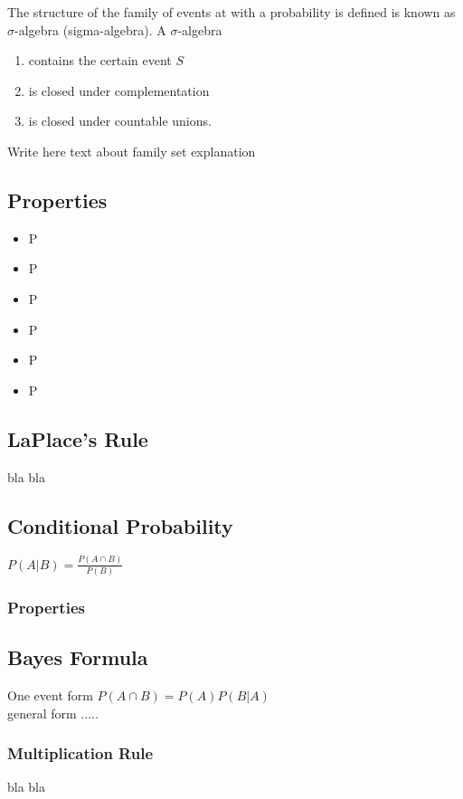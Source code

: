 The structure of the family of events at with a probability is defined is known as $\sigma$-algebra (sigma-algebra).
A $\sigma$-algebra 
\begin{enumerate}
    \item contains the certain event $S$
    \item is closed under complementation
    \item is closed under countable unions.
\end{enumerate}

Write here text about family set explanation

\subsection{Properties}
\begin{itemize}
    \item P
    \item P
    \item P
    \item P
    \item P
    \item P
\end{itemize}

\subsection{LaPlace's Rule}
bla bla

\subsection{Conditional Probability}
\begin{center}
    $P(A|B) = \frac{P(A\cap B)}{P(B)}$
\end{center}

\subsubsection{Properties}

\subsection{Bayes Formula}
One event form $P(A \cap B) = P(A)P(B|A)$\\
general form .....

\subsubsection{Multiplication Rule}
bla bla

